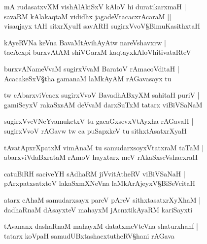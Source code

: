 \begin{shloka}
mA rudasatxvXM vishAlAkiSxV kAloV hi duratikarxmaH |\\
savaRM kAlakaqtaM vididhx jagadeVtacacxrAcaraM ||\\
visaqjayx tAH sitxrXyuH savARH sugirxVvoV\S BimuKasithxtaH 
\end{shloka}

\begin{shloka}
kAyeRVNa keVna BavaMtAvihAyAtw nareVshavxrw |\\
tacAcxpi burxvAtAM shiVGarxM kaqtayxkAloVhitivataRteV
\end{shloka}

\begin{shloka}
burxvANameVvaM sugirxVvaM BaratoV rAmacoVditaH |\\
AcacakeSxV\S tha gamanaM laMkAyAM rAGavasayx tu 
\end{shloka}

\begin{shloka}
tw cAbarxviVcacx sugirxVvoV BavadhABxyXM sahitaH puriV |\\
gamiSeyxV rakaSxsAM deVvaM darxSuTxM tatarx viBiVSaNaM 
\end{shloka}

\begin{shloka}
sugirxVveVNeYvamuketxV tu gacaGxsevxVtAyxha rAGavaH |\\
sugirxVvoV rAGavw tw ca puSapxkeV tu sithxtAsatxrXyaH 
\end{shloka}

\begin{shloka}
tAvatApxrXpatxM vimAnaM tu samudarxsoyxVtatxraM taTaM |\\
abarxviVdaBxrataM rAmoV hayxtarx meV rAkaSxseVshacxraH
\end{shloka}

\begin{shloka}
catuBiRH saciveYH sAdhaRM jiVvitAtheRV viBiVSaNaH |\\
pArxpatxsatxtoV lakaSxmXNeVna laMkArAjeyxV\S BiSeVcitaH 
\end{shloka}

\begin{shloka}
atarx cAhaM samudarxsayx pareV pAreV sithxtasatxrXyXhaM |\\
dadhaRnaM dAsayxteV mahayxM jAcnxtikAyaRM kariSayxti
\end{shloka}

\begin{shloka}
tAvananx dashaRnaM mahayxM datatxmeVteVna shaturxhanf |\\
tatarx koVpaH samudUBxtashacxtutheRV\S hani rAGava
\end{shloka}

